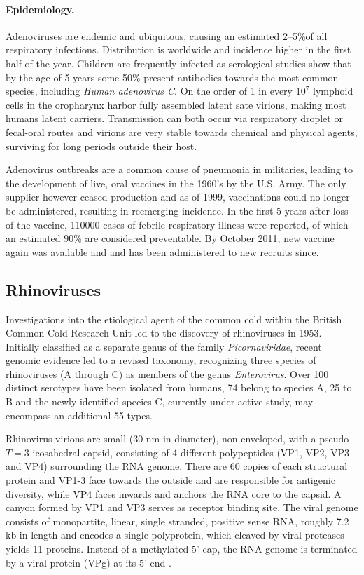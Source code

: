 \paragraph{Epidemiology.}
Adenoviruses are endemic and ubiquitous, causing an estimated 2--5\%of all respiratory infections. Distribution is worldwide and incidence higher in the first half of the year. Children are frequently infected as serological studies show that by the age of 5 years some 50\% present antibodies towards the most common species, including \textit{Human adenovirus C}. On the order of 1 in every $10^7$ lymphoid cells in the oropharynx harbor fully assembled latent sate virions, making most humans latent carriers. Transmission can both occur via respiratory droplet or fecal-oral routes and virions are very stable towards chemical and physical agents, surviving for long periods outside their host.

Adenovirus outbreaks are a common cause of pneumonia in militaries, leading to the development of live, oral vaccines in the 1960's by the U.S. Army. The only supplier however ceased production and as of 1999, vaccinations could no longer be administered, resulting in reemerging incidence. In the first 5 years after loss of the vaccine, 110000 cases of febrile respiratory illness were reported, of which an estimated 90\% are considered preventable. By October 2011, new vaccine again was available and and has been administered to new recruits since.

\subsection{Rhinoviruses}
Investigations into the etiological agent of the common cold within the British Common Cold Research Unit led to the discovery of rhinoviruses in 1953. Initially classified as a separate genus of the family \textit{Picornaviridae}, recent genomic evidence led to a revised taxonomy, recognizing three species of rhinoviruses (A through C) as members of the genus \textit{Enterovirus}. Over 100 distinct serotypes have been isolated from humans, 74 belong to species A, 25 to B and the newly identified species C, currently under active study, may encompass an additional 55 types.

Rhinovirus virions are small (30 nm in diameter), non-enveloped, with a pseudo $T=3$ icosahedral capsid, consisting of 4 different polypeptides (VP1, VP2, VP3 and VP4) surrounding the RNA genome. There are 60 copies of each structural protein and VP1-3 face towards the outside and are responsible for antigenic diversity, while VP4 faces inwards and anchors the RNA core to the capsid. A canyon formed by VP1 and VP3 serves as receptor binding site. The viral genome consists of monopartite, linear, single stranded, positive sense RNA, roughly 7.2 kb in length and encodes a single polyprotein, which cleaved by viral proteases yields 11 proteins. Instead of a methylated 5' cap, the RNA genome is terminated by a viral protein (VPg) at its 5' end \citep{Jacobs2013}.

